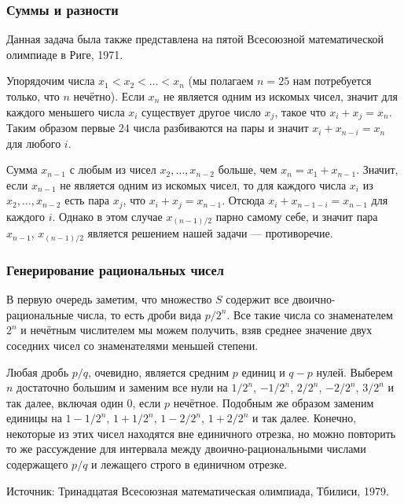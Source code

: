 \subsubsection*{Суммы и разности}%


Данная задача была также представлена на пятой  Всесоюзной математической олимпиаде в Риге, 1971.

\medskip

Упорядочим числа $x_1<x_2<\dots<x_n$ (мы полагаем $n=25$ нам потребуется только, что $n$ нечётно).
Если $x_n$  не является одним из искомых чисел, значит для каждого меньшего числа $x_i$ существует другое число $x_j$, такое что $x_i+x_j=x_n$.
Таким образом первые 24 числа разбиваются на пары и значит $x_i+x_{n-i}=x_n$ для любого $i$.

Сумма $x_{n-1}$ с любым из чисел $x_2,\dots,x_{n-2}$ больше, чем $x_n=x_1+x_{n-1}$.
Значит, если $x_{n-1}$ не является одним из искомых чисел, то для каждого числа $x_i$ из $x_2,\dots,x_{n-2}$ есть пара $x_j$, что 
$x_{i}+x_{j}=x_{n-1}$.
Отсюда $x_{i}+x_{n-1-i}=x_{n-1}$ для каждого $i$.
Однако в этом случае $x_{(n-1)/2}$ парно самому себе, 
и значит пара $x_{n-1}$, $x_{(n-1)/2}$ является решением нашей задачи --- противоречие.
\heart


\subsubsection*{Генерирование рациональных чисел}%


В первую очередь заметим, что множество $S$ содержит все двоично-рациональные числа, 
то есть дроби вида $p/2^n$.  
Все такие числа со знаменателем $2^n$ и нечётным числителем мы можем получить, взяв среднее значение двух  соседних чисел со знаменателями меньшей степени.


Любая дробь $p/q$, очевидно, является средним $p$ единиц и  $q-p$ нулей. 
Выберем $n$ достаточно большим и заменим все нули на $1/2^n$, $-1/2^n$, $2/2^n$, $-2/2^n$, $3/2^n$ и так далее, включая один $0$, если $p$ нечётное.  
Подобным же образом заменим единицы на  $1-1/2^n$, $1+1/2^n$, $1-2/2^n$, $1+2/2^n$ и так далее. 
Конечно, некоторые из этих чисел находятся вне единичного отрезка, но можно повторить то же рассуждение для интервала между двоично-рациональными числами содержащего $p/q$ и лежащего строго в единичном отрезке.%
\heart

Источник:  Тринадцатая Всесоюзная математическая олимпиада, Тбилиси, 1979.




